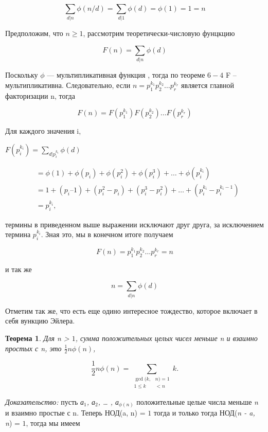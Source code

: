 \documentclass[11pt]{article}
\newtheorem{theorem}{Теорема}
\begin{document}
\[
\sum_{d|n}\phi(n/d) = \sum_{d|1}\phi(d) = \phi(1) = 1 = \textit{n}
\]

Предположим, что $n \geq 1$, рассмотрим теоретически-числовую фунцкцию

\[
F(n) = \sum_{d|n}\phi(d)
\]

Поскольку $\phi$ — мультипликативная функция , тогда по теореме $6-4$ F – мультипликативна. Следовательно, если $n = p_1^{k_{1}}p_2^{k_{2}} \ldots p_r^{k_{r}}$  является главной факторизации n, тогда 

\[
F(n) = F(p_1^{k_{1}})F(p_2^{k_{2}})\ldots F(p_r^{k_{r}})
\]

Для каждого значения i,

$
F(p_i^{k_{i}}) = \sum_{d|p_i^{k_{i}}}\phi(d)
$
	


\begin{align*}
	& = \phi(1) + \phi(p_i) + \phi(p_i^2) + \phi(p_i^3)+ \ldots + \phi(p_i^{k_{i}}) \\
	& = 1 + (p_i – 1) + (p_i^2  - p_i) + (p_i^3  - p_i^2 ) + \ldots + (p_i^{k_{i}}  - p_i^{k_{i} - 1}) \\
	& = p_i^{k_{i}},
\end{align*}

термины в приведенном выше выражении исключают друг друга, за исключением термина  $p_i^{k_{i}}$. Зная это, мы в конечном итоге получаем

\[
	F(n) = p_1^{k_{1}}p_2^{k_{2}}\ldots p_r^{k_{r}} = \textit{n}
\]

и так же 

\[
	n = \sum_{d|n}\phi(d)
\]

Отметим так же, что есть еще одино интересное тождество, которое включает в себя вункцию Эйлера.

\begin{theorem}
	Для  n > $1$, сумма положительных целых чисел меньше n и взаимно простых с n, это
	 $\frac{1}{2}n\phi(n)$,

\[
	\frac{1}{2}n\phi(n) = \sum\limits_{\begin{split} \gcd(k,& n) = 1\\ 1 \leq k& < n\end{split}}k.
\]
\end{theorem}

\textit{Доказательство:} пусть \textit{ а$_1$, а$_2$, … , а$_{\phi(n)}$}  положительные целые числа меньше \textit{n} и взаимно простые с n. Теперь НОД(a, n) = $1$ тогда и только тогда НОД(\textit{n - a, n}) = $1$, тогда мы имеем 
\end{document}
